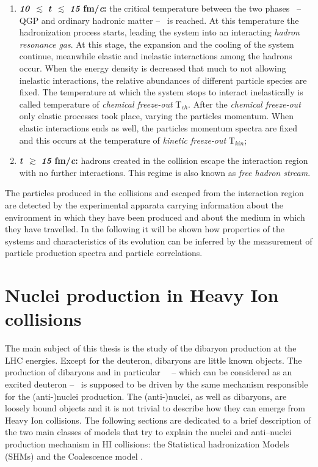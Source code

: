 \begin{enumerate}
    \item \textbf{\textit{10}} $\, \pmb{\lesssim}$ \textbf{\textit{t}} $\, \pmb{\lesssim}$ \textbf{\textit{15} fm/\textit{c}:}
            the critical temperature between the two phases \ -- QGP and ordinary hadronic matter -- \ is reached.
            At this temperature the hadronization process starts, leading the system into an interacting
            \textit{hadron resonance gas}. At this stage, the expansion and the cooling of the system continue, 
            meanwhile elastic and inelastic interactions among the hadrons occur. 
            When the energy density is decreased that much to not allowing inelastic interactions, the relative 
            abundances of different particle species are fixed. The temperature at which the system stops to 
            interact inelastically is called temperature of \textit{chemical freeze-out} T$_{ch}$. After the
            \textit{chemical freeze-out} only elastic processes took place, varying the particles momentum.
            When elastic interactions ends as well, the particles momentum spectra are fixed and this occurs
            at the temperature of \textit{kinetic freeze-out} T$_{kin}$;

    \item \textbf{\textit{t}} $\, \pmb{\gtrsim}$ \textbf{\textit{15} fm/\textit{c}:} hadrons created in 
            the collision escape the interaction region with no further interactions. This regime is 
            also known as \textit{free hadron stream}.
\end{enumerate}

The particles produced in the collisions and escaped from the interaction region are detected by 
the experimental apparata carrying information about the environment in 
which they have been produced and about the medium in which they have travelled. 
In the following it will be shown how properties of the systems and characteristics of its 
evolution can be inferred by the measurement of particle production spectra and particle correlations.

%
%
\section{Nuclei production in Heavy Ion collisions} \label{sec:1.4}

The main subject of this thesis is the study of the \dst dibaryon production at the LHC energies.
Except for the deuteron, dibaryons are little known objects.
The production of dibaryons and in particular \dst \ \ -- which can be considered as an excited deuteron -- \ is supposed to be driven by the same mechanism responsible for the (anti-)nuclei production.
The (anti-)nuclei, as well as dibaryons, are loosely bound objects and it is not trivial to describe how
they can emerge from Heavy Ion collisions. 
The following sections are dedicated to a brief description of the two main classes of models
that try to explain the nuclei and anti–nuclei production mechanism in HI collisions: the Statistical 
hadronization Models (SHMs) \cite{thermalmodel} and the Coalescence model \cite{deuprod}.

